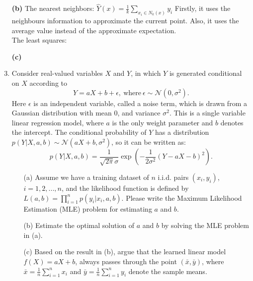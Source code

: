 \documentclass[10pt]{article}
\begin{document}
\begin{enumerate}[1.]
	\item[\textbf{(b)}] The nearest neighbors: $\hat{Y}(x)=\frac{1}{k}\sum_{x_i\in N_k(x)}y_i$
		  Firstly, it uses the neighbours information to approximate the current point. Also, it uses the average value instead of the approximate expectation.
		  \\The least squares: 
	\item[\textbf{(c)}] 

	      \newpage

	\item {} Consider real-valued variables $X$ and $Y$, in which $Y$ is generated conditional on $X$ according to
	      $$
		      Y = aX + b + \epsilon, \ \text{where} \ \epsilon \sim \mathcal{N}(0, \sigma^2).
	      $$
	      Here $\epsilon$ is an independent variable, called a noise term, which is drawn from a Gaussian distribution with mean 0,
	      and variance $\sigma^2$. This is a single variable linear regression model, where $a$ is the only weight parameter and $b$ denotes the intercept.
	      The conditional probability of $Y$ has a distribution $p(Y | X, a, b) \sim \mathcal{N}(aX+b, \sigma^2)$, so it can be written as:
	      $$
		      p(Y|X, a,b) = \frac{1}{\sqrt{2\pi}\sigma}\exp\left(-\frac{1}{2\sigma^2}(Y - aX -b)^2\right).
	      $$
	      \begin{itemize}
		      \item[(a)] Assume we have a training dataset of $n$ i.i.d. pairs $(x_i, y_i)$, $i = 1, 2, ..., n$, and
		            the likelihood function is defined by $L(a,b) = \prod_{i=1}^n p(y_i | x_i, a, b)$. Please write the
		            Maximum Likelihood Estimation (MLE) problem for estimating $a$ and $b$.~
		      \item[(b)] Estimate the optimal solution of $a$ and $b$ by solving the MLE problem in (a).~
		      \item[(c)] Based on the result in (b), argue that the learned linear model $f(X) = aX + b$,
		            always passes through the point $(\bar{x},\bar{y})$,
		            where $\bar{x} = \tfrac{1}{n}\sum_{i=1}^{n}x_{i}$ and $\bar{y} = \tfrac{1}{n}\sum_{i=1}^{n}y_{i}$ denote the sample means.~
	      \end{itemize}





	      \newpage


\end{enumerate}
\end{document}

